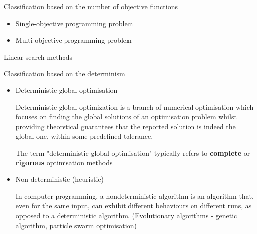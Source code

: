 \documentclass[10pt,aspectratio=169,notes]{beamer} %
\begin{document}
\begin{frame}{Classification based on the number of objective functions}
\begin{itemize}
	\item Single-objective programming problem
	\item Multi-objective programming problem
\end{itemize}
\end{frame}
\begin{frame}{Linear search methods}
	
\end{frame}
\note{}
\begin{frame}{Classification based on the determinism}
\begin{itemize}
	\item Deterministic global optimisation
		
	Deterministic global optimization is a branch of numerical optimisation which focuses on finding the global solutions of an optimisation problem whilst providing theoretical guarantees that the reported solution is indeed the global one, within some predefined tolerance. 
	
	The term "deterministic global optimisation" typically refers to \textbf{complete} or \textbf{rigorous} optimisation methods
	
	\item Non-deterministic (heuristic)
	
	In computer programming, a nondeterministic algorithm is an algorithm that, even for the same input, can exhibit different behaviours on different runs, as opposed to a deterministic algorithm.
	(Evolutionary algorithms - genetic algorithm, particle swarm optimisation)
\end{itemize}
\end{frame}
\end{document}
